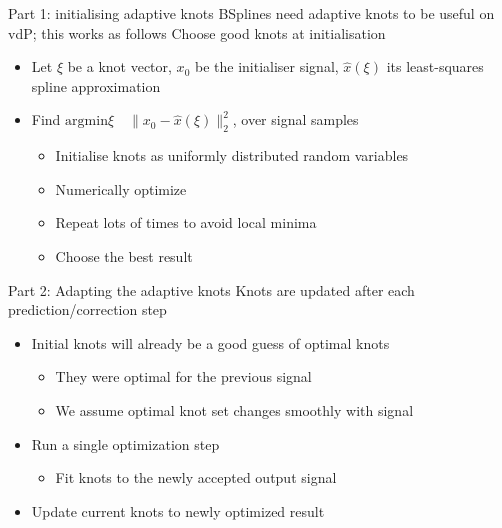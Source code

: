 \documentclass[presentation]{beamer}
\begin{document}
\begin{frame}[label={sec:org91031e6}]{Part 1: initialising adaptive knots}
BSplines need adaptive knots to be useful on vdP; this works as follows
\vfill
Choose good knots at initialisation
\begin{itemize}
\item Let \(\xi\) be a knot vector, \(x_0\) be the initialiser signal, \(\hat{x}(\xi)\) its least-squares spline approximation
\item Find \(\mathrm{argmin }\xi \quad \|x_0 - \hat{x}(\xi)\|_2^2\), over signal samples
\begin{itemize}
\item Initialise knots as uniformly distributed random variables
\item Numerically optimize
\item Repeat lots of times to avoid local minima
\item Choose the best result
\end{itemize}
\end{itemize}
\end{frame}

\begin{frame}[label={sec:orgdf1ac76}]{Part 2: Adapting the adaptive knots}
Knots are updated after each prediction/correction step
\vfill
\begin{itemize}
\item Initial knots will already be a good guess of optimal knots
\begin{itemize}
\item They were optimal for the previous signal
\item We assume optimal knot set changes smoothly with signal
\end{itemize}
\item Run a single optimization step
\begin{itemize}
\item Fit knots to the newly accepted output signal
\end{itemize}
\item Update current knots to newly optimized result
\end{itemize}
\end{frame}
\end{document}
